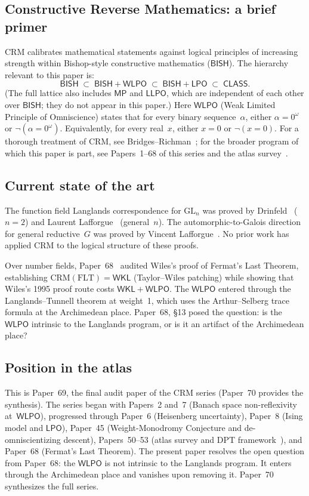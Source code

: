 \documentclass[11pt]{article}
\theoremstyle{plain}
\theoremstyle{definition}
\theoremstyle{remark}
\newcommand{\GL}{\mathrm{GL}}
\newcommand{\CRM}{\mathrm{CRM}}
\newcommand{\BISH}{\mathsf{BISH}}
\newcommand{\WKL}{\mathsf{WKL}}
\newcommand{\LPO}{\mathsf{LPO}}
\newcommand{\WLPO}{\mathsf{WLPO}}
\newcommand{\LLPO}{\mathsf{LLPO}}
\newcommand{\MP}{\mathsf{MP}}
\newcommand{\CLASS}{\mathsf{CLASS}}
\begin{document}
\subsection{Constructive Reverse Mathematics: a brief primer}

$\CRM$ calibrates mathematical statements against logical principles of
increasing strength within Bishop-style constructive mathematics ($\BISH$).
The hierarchy relevant to this paper is:
\[
\BISH \;\subset\; \BISH + \WLPO \;\subset\; \BISH + \LPO
  \;\subset\; \CLASS.
\]
(The full lattice also includes $\MP$ and $\LLPO$, which are independent of
each other over $\BISH$; they do not appear in this paper.)
Here $\WLPO$ (Weak Limited Principle of Omniscience) states that for every
binary sequence~$\alpha$, either $\alpha = 0^\omega$ or
$\lnot(\alpha = 0^\omega)$. Equivalently, for every real~$x$, either $x = 0$
or $\lnot(x = 0)$. For a thorough treatment of $\CRM$, see
Bridges--Richman~\cite{BridgesRichman1987}; for the broader program of which
this paper is part, see Papers~1--68 of this series and the atlas
survey~\cite{Paper50}.

\subsection{Current state of the art}

The function field Langlands correspondence for $\GL_n$ was proved by
Drinfeld~\cite{Drinfeld80} ($n = 2$) and Laurent Lafforgue~\cite{LLaf02}
(general~$n$). The automorphic-to-Galois direction for general reductive~$G$
was proved by Vincent Lafforgue~\cite{VLaf18}. No prior work has applied
$\CRM$ to the logical structure of these proofs.

Over number fields, Paper~68~\cite{Paper68} audited Wiles's proof of Fermat's
Last Theorem, establishing $\CRM(\text{FLT}) = \WKL$ (Taylor--Wiles patching) while showing that
Wiles's 1995 proof route costs $\WKL + \WLPO$. The $\WLPO$ entered through
the Langlands--Tunnell theorem at weight~1, which uses the Arthur--Selberg
trace formula at the Archimedean place. Paper~68, \S13 posed the question:
is the $\WLPO$ intrinsic to the Langlands program, or is it an artifact of the
Archimedean place?

\subsection{Position in the atlas}

This is Paper~69, the final audit paper of the $\CRM$ series (Paper~70
provides the synthesis). The series began with Papers~2 and~7 (Banach space
non-reflexivity at~$\WLPO$), progressed through Paper~6 (Heisenberg
uncertainty), Paper~8 (Ising model and $\LPO$), Paper~45 (Weight-Monodromy
Conjecture and de-omniscientizing descent), Papers~50--53 (atlas survey and DPT
framework~\cite{Paper50,Paper53}), and Paper~68 (Fermat's Last Theorem). The
present paper resolves the open question from Paper~68: the $\WLPO$ is not
intrinsic to the Langlands program. It enters through the Archimedean place and
vanishes upon removing it. Paper~70~\cite{Paper70} synthesizes the full series.
\end{document}
